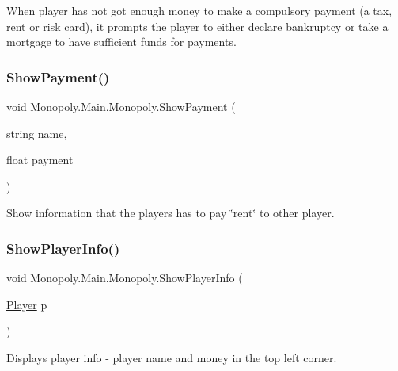 When player has not got enough money to make a compulsory payment (a tax, rent or risk card), it prompts the player to either declare bankruptcy or take a mortgage to have sufficient funds for payments. \mbox{\label{class_monopoly_1_1_main_1_1_monopoly_aa4d4c8d2749d4296b7a58adb91003cd1}} 
\subsubsection{\texorpdfstring{Show\+Payment()}{ShowPayment()}}
{\footnotesize\ttfamily void Monopoly.\+Main.\+Monopoly.\+Show\+Payment (\begin{DoxyParamCaption}\item[{string}]{name,  }\item[{float}]{payment }\end{DoxyParamCaption})\hspace{0.3cm}{\ttfamily [inline]}}

Show information that the players has to pay \char`\"{}rent\char`\"{} to other player. \mbox{\label{class_monopoly_1_1_main_1_1_monopoly_a66343fe4f4d61b53b09da023830b7ec2}} 
\subsubsection{\texorpdfstring{Show\+Player\+Info()}{ShowPlayerInfo()}}
{\footnotesize\ttfamily void Monopoly.\+Main.\+Monopoly.\+Show\+Player\+Info (\begin{DoxyParamCaption}\item[{\mbox{\hyperlink{class_monopoly_1_1_players_1_1_player}{Player}}}]{p }\end{DoxyParamCaption})\hspace{0.3cm}{\ttfamily [inline]}}

Displays player info -\/ player name and money in the top left corner. \mbox{\label{class_monopoly_1_1_main_1_1_monopoly_a31c1b4634e2034ade5b0873e8378ce6e}} 
